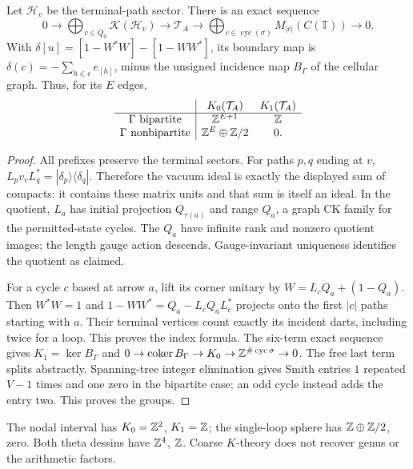 \begin{theorem}\label{thm:fock}
Let $\mathcal H_v$ be the terminal-path sector. There is an exact sequence
\[
 0\longrightarrow\bigoplus_{v\in Q_0}\mathcal K(\mathcal H_v)
 \longrightarrow\mathcal T_A\longrightarrow
 \bigoplus_{c\in\operatorname{cyc}(\sigma)}M_{|c|}(C(\mathbb T))\longrightarrow0.
\]
With $\delta[u]=[1-W^*W]-[1-WW^*]$, its boundary map is
$\delta(c)=-\sum_{h\in c}e_{[h]}$, minus the unsigned incidence map $B_\Gamma$ of the cellular graph. Thus, for its $E$ edges,
\[
\begin{array}{c|cc}
 &K_0(\mathcal T_A)&K_1(\mathcal T_A)\\\hline
\Gamma\text{ bipartite}&\mathbb Z^{E+1}&\mathbb Z\\
\Gamma\text{ nonbipartite}&\mathbb Z^E\oplus\mathbb Z/2&0.
\end{array}
\]
\end{theorem}
\begin{proof}
All prefixes preserve the terminal sectors. For paths $p,q$ ending at $v$, $L_pv_vL_q^*=|\delta_p\rangle\langle\delta_q|$. Therefore the vacuum ideal is exactly the displayed sum of compacts: it contains these matrix units and that sum is itself an ideal. In the quotient, $L_a$ has initial projection $Q_{\tau(a)}$ and range $Q_a$, a graph CK family for the permitted-state cycles. The $Q_a$ have infinite rank and nonzero quotient images; the length gauge action descends. Gauge-invariant uniqueness \cite[Theorem2.1]{BPRS} identifies the quotient as claimed.

For a cycle $c$ based at arrow $a$, lift its corner unitary by $W=L_cQ_a+(1-Q_a)$. Then $W^*W=1$ and $1-WW^*=Q_a-L_cQ_aL_c^*$ projects onto the first $|c|$ paths starting with $a$. Their terminal vertices count exactly its incident darts, including twice for a loop. This proves the index formula. The six-term exact sequence gives $K_1=\ker B_\Gamma$ and $0\to\operatorname{coker}B_\Gamma\to K_0\to\mathbb Z^{\#\operatorname{cyc}\sigma}\to0$. The free last term splits abstractly. Spanning-tree integer elimination gives Smith entries $1$ repeated $V-1$ times and one zero in the bipartite case; an odd cycle instead adds the entry two. This proves the groups.
\end{proof}
The nodal interval has $K_0=\mathbb Z^2$, $K_1=\mathbb Z$; the single-loop sphere has $\mathbb Z\oplus\mathbb Z/2$, zero. Both theta dessins have $\mathbb Z^4$, $\mathbb Z$. Coarse $K$-theory does not recover genus or the arithmetic factors.

